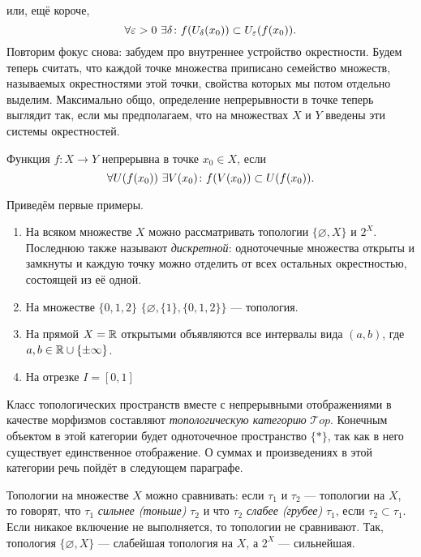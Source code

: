или, ещё короче,
	\begin{equation}
		\forall\varepsilon>0\ \exists\delta\colon f(U_{\delta}(x_0))\subset U_{\varepsilon}(f(x_0)).
	\end{equation}
Повторим фокус снова: забудем про внутреннее устройство окрестности. Будем теперь считать, что каждой точке множества приписано семейство множеств, называемых окрестностями этой точки, свойства которых мы потом отдельно выделим. Максимально общо, определение непрерывности в точке теперь выглядит так, если мы предполагаем, что на множествах $X$ и $Y$ введены эти системы окрестностей.
\begin{defin}
	Функция $f\colon X\to Y$ непрерывна в точке $x_0\in X$, если
	\begin{equation}
		\forall U(f(x_0))\ \exists V(x_0)\colon f(V(x_0))\subset U(f(x_0)).
	\end{equation}
\end{defin}

Приведём первые примеры.
\begin{enumerate}
	\item На всяком множестве $X$ можно рассматривать топологии $\{\varnothing, X\}$ и $2^X$. Последнюю также называют \textit{дискретной}: одноточечные множества открыты и замкнуты и каждую точку можно отделить от всех остальных окрестностью, состоящей из её одной.
	\item На множестве $\{0,1,2\}$ $\{\varnothing, \{1\}, \{0,1,2\}\}$ --- топология.
	\item На прямой $X=\mathbb {R}$ открытыми объявляются все интервалы вида $(a,b)$, где $a,b\in\mathbb {R}\cup\{\pm\infty\}$.
	\item На отрезке $I=[0,1]$
\end{enumerate}

Класс топологических пространств вместе с непрерывными отображениями в качестве морфизмов составляют \textit{топологическую категорию} $\mathcal{T}op$. Конечным объектом в этой категории будет одноточечное пространство $\{*\}$, так как в него существует единственное отображение. О суммах и произведениях в этой категории речь пойдёт в следующем параграфе. 

Топологии на множестве $X$ можно сравнивать: если $\tau_1$ и $\tau_2$ --- топологии на $X$, то говорят, что $\tau_1$ \textit{сильнее (тоньше)} $\tau_2$ и что $\tau_2$ \textit{слабее (грубее)} $\tau_1$, если $\tau_2\subset\tau_1$. Если никакое включение не выполняется, то топологии не сравнивают. Так, топология $\{\varnothing, X\}$ --- слабейшая топология на $X$, а $2^X$ --- сильнейшая.

